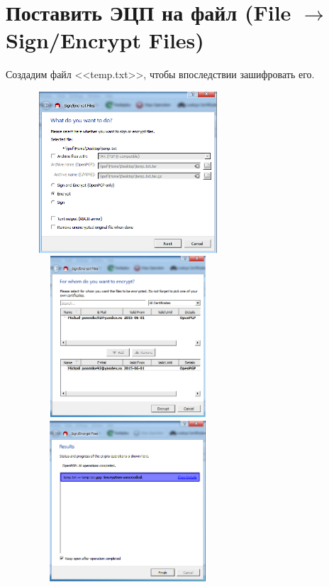 \documentclass[utf8x, 12pt]{G7-32}
\begin{document}
\newpage

\section{Поставить ЭЦП на файл (File $\rightarrow$ Sign/Encrypt Files)}

Создадим файл <<temp.txt>>, чтобы впоследствии зашифровать его.

\begin{figure}[hhh!]
	\begin{center}
		\includegraphics[width=7cm, height=6cm]{img/3_1}
		\includegraphics[width=7cm, height=6cm]{img/3_2}
		\includegraphics[width=7cm, height=6cm]{img/3_3}
	\end{center}
\end{figure}	
\end{document}
